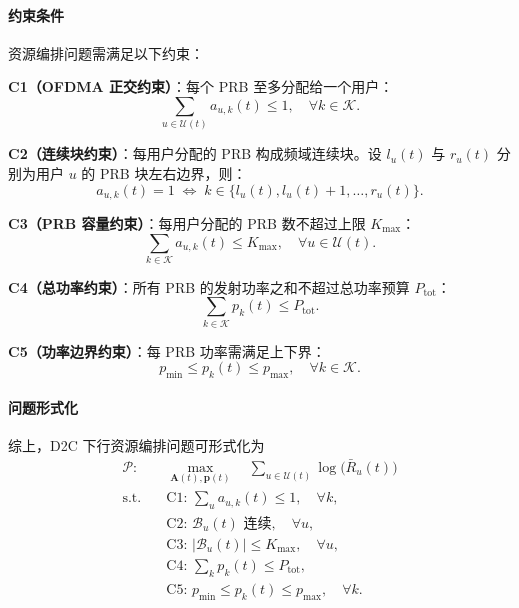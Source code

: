 \documentclass[type=master]{fduthesis}
\begin{document}
\paragraph{约束条件}
资源编排问题需满足以下约束：

\textbf{C1（OFDMA 正交约束）}：每个 PRB 至多分配给一个用户：
\begin{equation}
\sum_{u \in \mathcal{U}(t)} a_{u,k}(t) \leq 1, \quad \forall k \in \mathcal{K}.
\label{eq:ch4_c1_orthogonal}
\end{equation}

\textbf{C2（连续块约束）}：每用户分配的 PRB 构成频域连续块。设 $l_u(t)$ 与 $r_u(t)$ 分别为用户 $u$ 的 PRB 块左右边界，则：
\begin{equation}
a_{u,k}(t) = 1 \;\Leftrightarrow\; k \in \{l_u(t), l_u(t){+}1, \ldots, r_u(t)\}.
\label{eq:ch4_c2_contiguous}
\end{equation}

\textbf{C3（PRB 容量约束）}：每用户分配的 PRB 数不超过上限 $K_{\max}$：
\begin{equation}
\sum_{k \in \mathcal{K}} a_{u,k}(t) \leq K_{\max}, \quad \forall u \in \mathcal{U}(t).
\label{eq:ch4_c3_prb_cap}
\end{equation}

\textbf{C4（总功率约束）}：所有 PRB 的发射功率之和不超过总功率预算 $P_{\mathrm{tot}}$：
\begin{equation}
\sum_{k \in \mathcal{K}} p_k(t) \leq P_{\mathrm{tot}}.
\label{eq:ch4_c4_power_total}
\end{equation}

\textbf{C5（功率边界约束）}：每 PRB 功率需满足上下界：
\begin{equation}
p_{\min} \leq p_k(t) \leq p_{\max}, \quad \forall k \in \mathcal{K}.
\label{eq:ch4_c5_power_box}
\end{equation}

\paragraph{问题形式化}
综上，D2C 下行资源编排问题可形式化为
\begin{align}
\mathcal{P}: \quad & \max_{\mathbf{A}(t), \mathbf{p}(t)} \quad \sum_{u \in \mathcal{U}(t)} \log\big(\bar{R}_u(t)\big) \label{eq:ch4_problem_obj} \\
\text{s.t.} \quad
& \text{C1: } \sum_{u} a_{u,k}(t) \leq 1, \quad \forall k, \label{eq:ch4_problem_c1} \\
& \text{C2: } \mathcal{B}_u(t) \text{ 连续}, \quad \forall u, \label{eq:ch4_problem_c2} \\
& \text{C3: } |\mathcal{B}_u(t)| \leq K_{\max}, \quad \forall u, \label{eq:ch4_problem_c3} \\
& \text{C4: } \sum_{k} p_k(t) \leq P_{\mathrm{tot}}, \label{eq:ch4_problem_c4} \\
& \text{C5: } p_{\min} \leq p_k(t) \leq p_{\max}, \quad \forall k. \label{eq:ch4_problem_c5}
\end{align}
\end{document}
